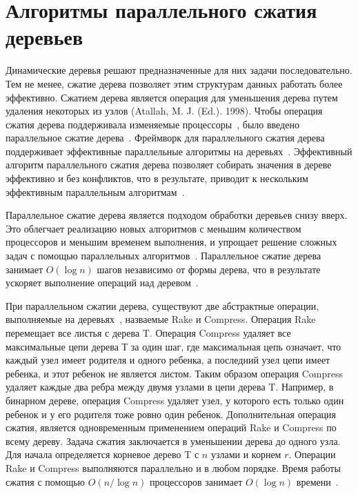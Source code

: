 \documentclass[specification,annotation]{itmo-student-thesis}
\begin{document}
\section{Алгоритмы параллельного сжатия деревьев}\label{survey-contraction}

Динамические деревья решают предназначенные для них задачи последовательно. Тем не менее, сжатие дерева позволяет этим структурам данных 
работать более эффективно. Сжатием дерева является операция для уменьшения дерева путем удаления некоторых из узлов (Atallah, M. J. (Ed.). 1998). Чтобы 
операция сжатия дерева поддерживала изменяемые процессоры~\cite{miller85, miller89}, было введено параллельное сжатие дерева~\cite{miller91, reif94}. 
Фреймворк для параллельного сжатия дерева поддерживает эффективные параллельные алгоритмы на деревьях~\cite{morihata08}. Эффективный алгоритм параллельного 
сжатия дерева позволяет собирать значения в дереве эффективно и без конфликтов, что в результате, приводит к нескольким эффективным параллельным 
алгоритмам~\cite{morihata11}.

Параллельное сжатие дерева является подходом обработки деревьев снизу вверх. Это облегчает реализацию новых алгоритмов с меньшим 
количеством процессоров и меньшим временем выполнения, и упрощает решение сложных задач с помощью параллельных алгоритмов~\cite{miller85}. Параллельное 
сжатие дерева занимает $O(\log n)$ шагов независимо от формы дерева, что в результате ускоряет 
выполнение операций над деревом~\cite{morihata14}.

При параллельном сжатии дерева, существуют две абстрактные операции, выполняемые на деревьях~\cite{miller85}, назваемые Rake и Compress. Операция Rake 
перемещает все листья с дерева T. Операция Compress удаляет все максимальные цепи дерева Т за один шаг, где максимальная цепь означает, что каждый 
узел имеет родителя и одного ребенка, а последний узел цепи имеет ребенка, и этот ребенок не является листом. Таким образом операция Compress удаляет 
каждые два ребра между двумя узлами в цепи дерева T. Например, в бинарном дереве, операция Compress удаляет узел, у которого есть только один ребенок и 
у его родителя тоже ровно один ребенок. Дополнительная операция сжатия, является одновременным применением операций Rake и Compress по всему дереву. Задача 
сжатия заключается в уменьшении дерева до одного узла. Для начала определяется корневое дерево T с $n$ узлами и корнем $r$. Операции Rake и 
Compress выполняются параллельно и в любом порядке. Время работы сжатия с помощью $O (n/\log n)$ процессоров занимает $O(\log n)$ времени~\cite{miller85}.
\end{document}
